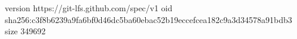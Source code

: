 version https://git-lfs.github.com/spec/v1
oid sha256:c3f8b6239a9fa6bf0d46dc5ba60ebac52b19eccefcea182c9a3d34578a91bdb3
size 349692
